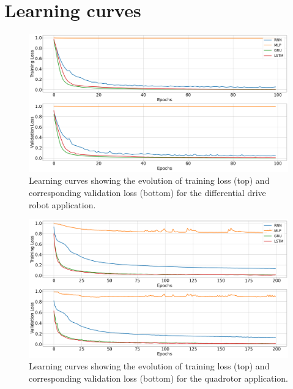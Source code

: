 \chapter{Learning curves}\label{chap:appendixB}

\begin{figure} [h]
    \centering
    \vspace{-0.2cm}
    \includegraphics[width=0.95\linewidth]{figures/learning_unic/learning_curves.png}
    \caption{Learning curves showing the evolution of training loss (top) and corresponding validation loss (bottom) for the differential drive robot application.}
    \label{fig:appendix_B_unic}
\end{figure}

\begin{figure} [h]
    \centering
    \vspace{-1cm}
    \includegraphics[width=0.95\linewidth]{figures/learning_quadrotor/learning_curves.png}
    \caption{Learning curves showing the evolution of training loss (top) and corresponding validation loss (bottom) for the quadrotor application.}
    \label{fig:appendix_B_quad}
\end{figure}